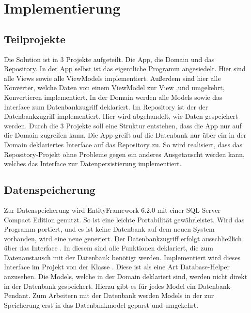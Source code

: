 \section{Implementierung}

\subsection{Teilprojekte}


Die Solution ist in 3 Projekte aufgeteilt. Die App, die Domain und das Repository. In der App selbst ist das eigentliche Programm angesiedelt. Hier sind alle Views sowie alle ViewModels implementiert. Außerdem sind hier alle Konverter, welche Daten von einem ViewModel zur View ,und umgekehrt, Konvertieren implementiert. In der Domain werden alle Models sowie das Interface zum Datenbankzugriff deklariert. Im Repository ist der der Datenbankzugriff implementiert. Hier wird abgehandelt, wie Daten gespeichert werden. Durch die 3 Projekte soll eine Struktur entstehen, dass die App nur auf die Domain zugreifen kann. Die App greift auf die Datenbank nur über ein in der Domain deklariertes Interface auf das Repository zu. So wird realisiert, dass das Repository-Projekt ohne Probleme gegen ein anderes Ausgetauscht werden kann, welches das Interface zur Datenpersistierung implementiert. 

\subsection{Datenspeicherung}
Zur Datenspeicherung wird EntityFramework 6.2.0 mit einer SQL-Server Compact Edition genutzt. So ist eine leichte Portabilität gewährleistet. Wird das Programm portiert, und es ist keine Datenbank auf dem neuen System vorhanden, wird eine neue generiert. Der Datenbankzugriff erfolgt ausschließlich über das Interface . In diesem sind alle Funktionen deklariert, die zum Datenaustausch mit der Datenbank benötigt werden. Implementiert wird dieses Interface im Projekt  von der Klasse . Diese ist als eine Art Database-Helper anzusehen. Die Models, welche in der Domain deklariert sind, werden nicht direkt in der Datenbank gespeichert. Hierzu gibt es für jedes Model ein Datenbank-Pendant. Zum Arbeitern mit der Datenbank werden Models in der  zur Speicherung erst in das Datenbankmodel geparst und umgekehrt.

